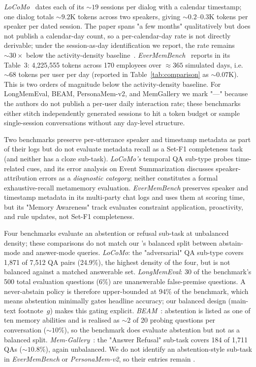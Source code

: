 \emph{LoCoMo}~\citep{maharana2024evaluating} dates each of its $\sim\!19$ sessions per dialog with a calendar timestamp; one dialog totals $\sim\!9.2$K tokens across two speakers, giving $\sim\!0.2$--$0.3$K tokens per speaker per dated session. The paper spans "a few months" qualitatively but does not publish a calendar-day count, so a per-calendar-day rate is not directly derivable; under the session-as-day identification we report, the rate remains $\sim\!30\times$ below the activity-density baseline~\citep{mehl2007women,tidwell2025talkative}.
\emph{EverMemBench}~\citep{hu2026evermembench} reports in its Table~3: 4{,}225{,}555 tokens across 170 employees over $\approx\!365$ simulated days, i.e.\ $\sim\!68$ tokens per user per day (reported in Table~\ref{tab:comparison} as $\sim\!0.07$K). This is two orders of magnitude below the activity-density baseline.
For LongMemEval, BEAM, PersonaMem-v2, and MemGallery we mark "---" because the authors do not publish a per-user daily interaction rate; these benchmarks either stitch independently generated sessions to hit a token budget or sample single-session conversations without any day-level structure.

Two benchmarks preserve per-utterance speaker and timestamp metadata as part of their logs but do not evaluate metadata recall as a Set-F1 completeness task (and neither has a cloze sub-task).
\emph{LoCoMo's} temporal QA sub-type probes time-related cues, and its error analysis on Event Summarization discusses speaker-attribution errors as a \emph{diagnostic category}; neither constitutes a formal exhaustive-recall metamemory evaluation.
\emph{EverMemBench} preserves speaker and timestamp metadata in its multi-party chat logs and uses them at scoring time, but its "Memory Awareness" track evaluates constraint application, proactivity, and rule updates, not Set-F1 completeness.

Four benchmarks evaluate an abstention or refusal sub-task at unbalanced density; these comparisons do not match our \DFiveID's balanced split between abstain-mode and answer-mode queries.
\emph{LoCoMo}: the "adversarial" QA sub-type covers 1{,}871 of 7{,}512 QA pairs (24.9\%), the highest density of the four, but is not balanced against a matched answerable set.
\emph{LongMemEval}: 30 of the benchmark's 500 total evaluation questions (6\%) are unanswerable false-premise questions. A never-abstain policy is therefore upper-bounded at 94\% of the benchmark, which means abstention minimally gates headline accuracy; our balanced design (main-text footnote~$g$) makes this gating explicit.
\emph{BEAM}~\citep{tavakoli2025beam}: abstention is listed as one of ten memory abilities and is realised as $\sim\!2$ of 20 probing questions per conversation ($\sim\!10\%$), so the benchmark does evaluate abstention but not as a balanced split.
\emph{Mem-Gallery}~\citep{bei2026memgallery}: the "Answer Refusal" sub-task covers 184 of 1{,}711 QAs ($\sim\!10.8\%$), again unbalanced.
We do not identify an abstention-style sub-task in \emph{EverMemBench} or \emph{PersonaMem-v2}, so their \DFiveID entries remain \xmark.


